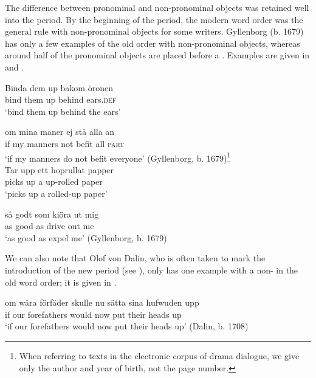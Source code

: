 \documentclass[output=paper]{langscibook}
\begin{document}
The difference between pronominal and non-pronominal objects was retained well into the  period. By the beginning of the period, the modern word order was the general rule with non-pronominal objects for some writers. Gyllenborg (b. 1679) has only a few examples of the old order with non-pronominal objects, whereas around half of the pronominal objects are placed before a . Examples are given in  and .


\ea\label{ex:lalu:37}
\ea\label{ex:lalu:37a}
\gll  Binda   dem     up     bakom   öronen\\
    bind     them     up     behind   ears\textsc{.def}\\
\glt `bind them up behind the ears'

\ex\label{ex:lalu:37b}
\gll  om   mina   maner     ej     stå   alla   an \\
    if     my     manners   not   befit   all   \textsc{part}\\
\glt `if my manners do not befit everyone'      (Gyllenborg, b. 1679)\footnote{When referring to texts in the electronic corpus of  drama dialogue, we give only the author and year of birth, not the page number.} \\
\z
\ex\label{ex:lalu:38}
\ea
\gll  Tar   upp   ett   hoprullat   papper\\
    picks     up   a     up-rolled     paper\\
\glt `picks up a rolled-up paper'

\ex
\gll  så    godt   som   kiöra    ut     mig \\
    as    good   as     drive     out   me\\
\glt `as good as expel me’ (Gyllenborg, b. 1679)\\
\z
\z


We can also note that Olof von Dalin, who is often taken to mark the introduction of the new period (see ), only has one example with a non- in the old word order; it is given in .


\ea\label{ex:lalu:39}
\gll  om   wåra   förfäder       skulle   nu   sätta   sina   hufwuden   upp\\
if     our     forefathers     would   now   put   their     heads     up\\
\glt `if our forefathers would now put their heads up’ (Dalin, b. 1708)\\
\z
\end{document}
